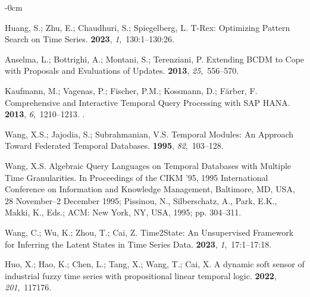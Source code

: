 \documentclass[information,article,accept,pdftex,oneauthor]{Definitions/mdpi}
\begin{document}
\begin{adjustwidth}{-\extralength}{0cm}
\begin{thebibliography}{999}
Huang, S.; Zhu, E.; Chaudhuri, S.; Spiegelberg, L.
\newblock T-Rex: Optimizing Pattern Search on Time Series.
 {\bf 2023}, {\em 1},~130:1--130:26.

Anselma, L.; Bottrighi, A.; Montani, S.; Terenziani, P.
\newblock Extending BCDM to Cope with Proposals and Evaluations of Updates.
 {\bf 2013},
  {\em 25},~556--570.

Kaufmann, M.; Vagenas, P.; Fischer, P.M.; Kossmann, D.; F{\"{a}}rber, F.
\newblock Comprehensive and Interactive Temporal Query Processing with {SAP}
  {HANA}.
 {\bf 2013}, {\em 6},~1210--1213.
.

Wang, X.S.; Jajodia, S.; Subrahmanian, V.S.
\newblock Temporal Modules: An Approach Toward Federated Temporal Databases.
 {\bf 1995}, {\em 82},~103--128.

Wang, X.S.
\newblock Algebraic Query Languages on Temporal Databases with Multiple Time
  Granularities.
\newblock In Proceedings of the {CIKM} '95, 1995
  International Conference on Information and Knowledge Management, Baltimore, MD, {USA}, 28 November--2 December  1995; Pissinou, N., Silberschatz,
  A., Park, E.K., Makki, K., Eds.; {ACM}:  {New York, NY, USA,}   1995; pp. 304--311.

Wang, C.; Wu, K.; Zhou, T.; Cai, Z.
\newblock Time2State: An Unsupervised Framework for Inferring the Latent States
  in Time Series Data.
 {\bf 2023}, {\em 1},~17:1--17:18.

Huo, X.; Hao, K.; Chen, L.;  Tang, X.; Wang, T.; Cai, X.
\newblock A dynamic soft sensor of industrial fuzzy time series with
  propositional linear temporal logic.
 {\bf 2022}, {\em 201},~117176.


\end{thebibliography}
\end{adjustwidth}
\end{document}
